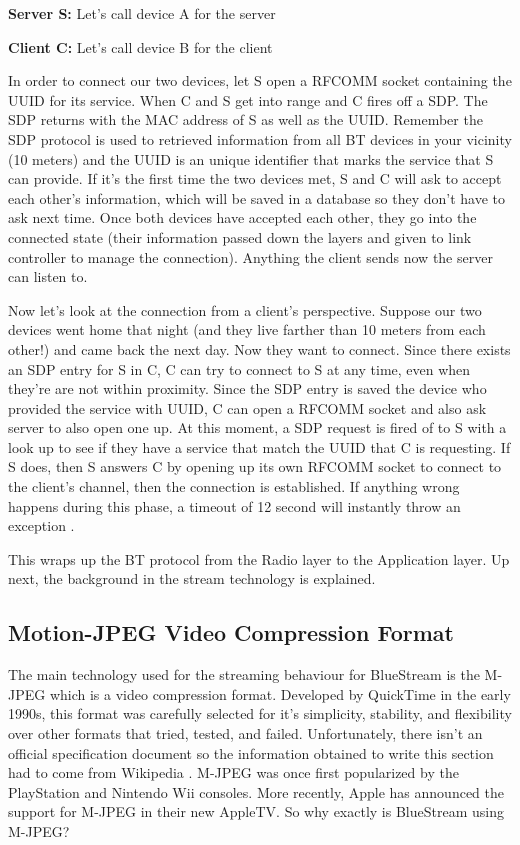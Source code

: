 \documentclass[a4paper,12pt]{article}
\begin{document}
\textbf{Server S: } Let’s call device A for the server

\textbf{Client C:} Let’s call device B for the client

In order to connect our two devices, let S open a RFCOMM socket containing the UUID for its service. When C and S get into range and C fires off a SDP. The SDP returns with the MAC address of S as well as the UUID. Remember the SDP protocol is used to retrieved information from all BT devices in your vicinity (10 meters) and the UUID is an unique identifier that marks the service that S can provide. If it’s the first time the two devices met, S and C will ask to accept each other’s information, which will be saved in a database so they don’t have to ask next time. Once both devices have accepted each other, they go into the connected state (their information passed down the layers and given to link controller to manage the connection). Anything the client sends now the server can listen to.

Now let’s look at the connection from a client’s perspective. Suppose our two devices went home that night (and they live farther than 10 meters from each other!) and came back the next day. Now they want to connect. Since there exists an SDP entry for S in C, C can try to connect to S at any time, even when they’re are not within proximity. Since the SDP entry is saved the device who provided the service with UUID, C can open a RFCOMM socket and also ask server to also open one up. At this moment, a SDP request is fired of to S with a look up to see if they have a service that match the UUID that C is requesting. If S does, then S answers C by opening up its own RFCOMM socket to connect to the client’s channel, then the connection is established. If anything wrong happens during this phase, a timeout of 12 second will instantly throw an exception \cite{BlueToothRevealed}. 

This wraps up the BT protocol from the Radio layer to the Application layer. Up next, the background in the stream technology is explained.

\subsection{Motion-JPEG Video Compression Format}
The main technology used for the streaming behaviour for BlueStream is the M-JPEG which is a video compression format. Developed by QuickTime in the early 1990s, this format was carefully selected for it’s simplicity, stability, and flexibility over other formats that tried, tested, and failed. Unfortunately, there isn’t an official specification document so the information obtained to write this section had to come from Wikipedia \cite{MotionJPEG}. M-JPEG was once first popularized by the PlayStation and Nintendo Wii consoles. More recently, Apple has announced the support for M-JPEG in their new AppleTV. So why exactly is BlueStream using M-JPEG?
\end{document}
